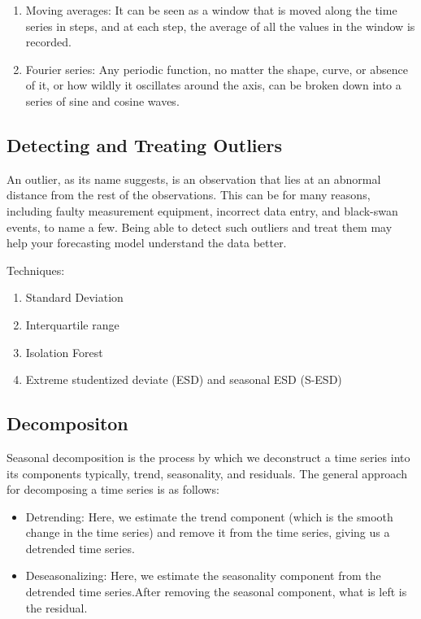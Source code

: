 \documentclass{article}
\begin{document}
\begin{enumerate}
    \item Moving averages: It can
    be seen as a window that is moved along the time series in steps, and at each step, the average of all
    the values in the window is recorded.
    \item Fourier series: Any periodic function, no matter the shape, curve, or
    absence of it, or how wildly it oscillates around the axis, can be broken down into a series of sine and
    cosine waves.
\end{enumerate}

\subsection{Detecting and Treating Outliers}
An outlier, as its name suggests, is an observation that lies at an abnormal distance from
the rest of the observations. This can be for many reasons, including faulty measurement
equipment, incorrect data entry, and black-swan events, to name a few. Being able to detect such
outliers and treat them may help your forecasting model understand the data better.

Techniques:
\begin{enumerate}
    \item Standard Deviation
    \item Interquartile range
    \item Isolation Forest 
    \item Extreme studentized deviate (ESD) and seasonal ESD (S-ESD)
\end{enumerate}

\subsection{Decompositon}
Seasonal decomposition is the process by which we deconstruct a time series into its components 
typically, trend, seasonality, and residuals. The general approach for decomposing a time series is as follows:
\begin{itemize}
    \item Detrending: Here, we estimate the trend component (which is the smooth change in the time
series) and remove it from the time series, giving us a detrended time series.
    \item Deseasonalizing: Here, we estimate the seasonality component from the detrended time series.After removing the seasonal component, what is left is the residual.
\end{itemize}
\end{document}
